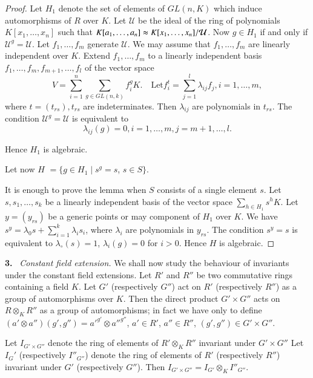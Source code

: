 \begin{proof}
 Let $H_1$ denote  the set of elements  of $GL (n,K)$ which  induce
 automorphisms of $R$ over $K$. Let $\mathcal{U}$ be the  ideal of the
 ring  of  polynomials $K[x_1, \ldots , x_n]$ such that $K[a_1, \ldots
   , a_n] \thickapprox  K [x_1, \ldots , x_n]/ \mathcal{U}$. Now $g
 \in  H_1$ if and only  if $\mathcal{U}^g= \mathcal{U}$. Let $f_1,
 \ldots , f_m$ generate $\mathcal{U}$. We may assume that $f_1, \ldots
 , f_m $ are linearly independent  over $K$. Extend $f_1, \ldots ,
 f_m$  to a linearly independent basis $f_1, \ldots , f_m, f_{m+1}, \ldots ,
 f_l$ of  the  vector  space 
$$
V=  \sum\limits_{i=1}^{n}  \sum\limits_{g \in GL(n,k)}  f_i^g
K. \quad \text{Let} f_i^t =  \sum\limits_{j=1}^{l} \lambda_{ij}f_j, i=1,
\ldots ,m, 
$$
where $t=(t_{rs}),t_{rs}$ are  indeterminates. Then  $\lambda_{ij}$
are polynomials in $t_{rs}$. The  condition
$\mathcal{U}^g=\mathcal{U}$ is equivalent to  
$$
\lambda_{ij}(g)=0,i=1, \ldots , m, j=m+1, \ldots, l.
$$\pageoriginale

Hence $H_1$ is algebraic.


Let  now $H$ $=\bigg\{g \in H_1 \mid s^g=s$, $s \in S \bigg\}$.

It is enough  to prove  the  lemma  when  $S$ consists  of a single
element $s$. Let  $s,s_1, \ldots , s_k$ be a linearly independent
basis  of the  vector  space  $\sum\limits_{h \in H_1} s^h  K$. Let
$y=(y_{rs})$ be a generic  points  or may  component  of  $H_1$ over
$K$. We have  $s^y= \lambda_0s + \sum\limits_{i=1}^{k}  \lambda_i
s_i$, where $\lambda_i$ are  polynomials in $y_{rs}$. The  condition
$s^y=s$ is  equivalent  to $\lambda_\circ(s)=1$, $\lambda_i(g)=0$ for
$i > 0$. Hence  $H$ is algebraic. 
\end{proof}

{\bf 3.}~ \textit{Constant field  extension.}
 We shall  now  study  the
  behaviour  of  invariants under  the  constant  field
  extensions. Let  $R'$ and  $R''$ be two commutative rings containing
  a field  $K$. Let  $G'$ (respectively $G''$) act on $R'$
  (respectively $R''$) as a  group  of automorphisms over $K$. Then
  the direct  product $G'\times G''$ acts on $R \otimes_K R''$ as a
  group  of automorphisms; in  fact  we have  only  to define $( a'
  \otimes a'') (g',g'')=a'^{g'}\otimes a''^{g''}$, $a' \in R'$, $a'' \in
  R''$, $(g',g'')\in G' \times G''$. 

\begin{lem}\label{chap1:lem1}%
 Let $I_{G'\times G''}$ denote  the  ring of elements of  $ R'{\otimes}_K
 R''$  invariant under $G' \times G''$ Let  $ I_G'$ (respectively
 $I''_{G''}$) denote  the  ring  of elements  of $R'$ (respectively
 $R''$) invariant under  $G'$ (respectively $G''$). Then  $I_{G'\times
 G''}=I_{G'} \otimes_K I''_{G''}$. 
\end{lem}

